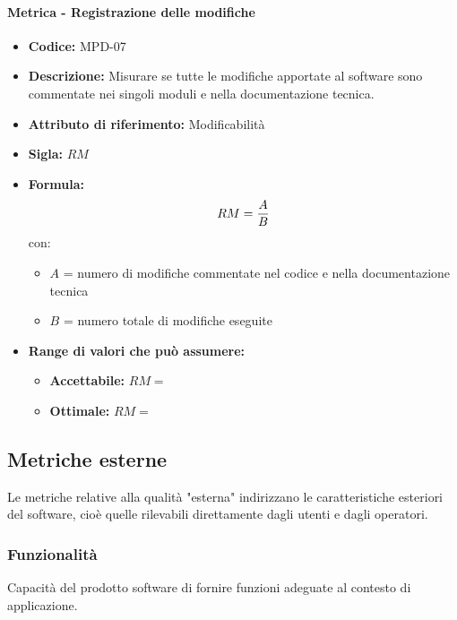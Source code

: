 \paragraph{Metrica - Registrazione delle modifiche} 
   \begin{itemize}
          \item  \textbf{Codice:} MPD-07
         \item   \textbf{Descrizione:} Misurare se tutte le modifiche apportate al software sono commentate nei singoli moduli e nella documentazione tecnica.
         \item   \textbf{Attributo di riferimento:} Modificabilità
         \item   \textbf{Sigla:} $RM$
         \item   \textbf{Formula:} $$RM = {A \over B}$$
         con:
         \begin{itemize}
            \item $A$ = numero di modifiche commentate nel codice e nella documentazione tecnica
            \item $B$ = numero totale di modifiche eseguite
         \end{itemize}

        \item \textbf{Range di valori che può assumere:}
        \begin{itemize}
            \item \textbf{Accettabile:} $RM = $
            \item \textbf{Ottimale:} $RM = $
        \end{itemize}
       \end{itemize}
              
       
\subsection{Metriche esterne}
Le metriche relative alla qualità "esterna" indirizzano le caratteristiche esteriori del software, cioè quelle rilevabili direttamente dagli utenti e dagli operatori.
   \subsubsection{Funzionalità}
   Capacità del prodotto software di fornire funzioni adeguate al contesto di applicazione.
   
